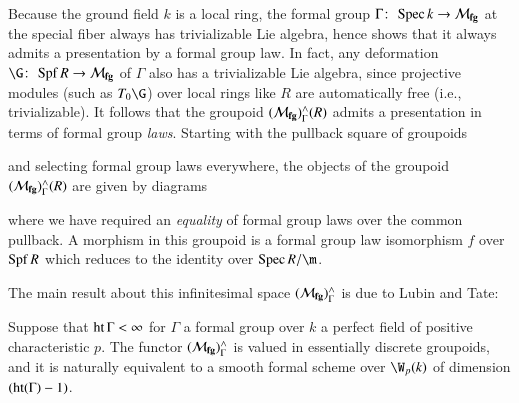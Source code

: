 \begin{remark}\label{LubinTateStackInFGLTerms}
Because the ground field $k$ is a local ring, the formal group $\Gamma\colon\thinspace \operatorname{Spec} k \to \mathcal{M}_{\mathbf{fg}}$ at the special fiber always has trivializable Lie algebra, hence  shows that it always admits a presentation by a formal group law.  In fact, any deformation $\G\co \Spf R \to \moduli{fg}$ of $\Gamma$ also has a trivializable Lie algebra, since projective modules (such as $T_0 \G$) over local rings like $R$ are automatically free (i.e., trivializable).  It follows that the groupoid $(\mathcal{M}_{\mathbf{fg}})^\wedge_\Gamma(R)$ admits a presentation in terms of formal group \emph{laws}.  Starting with the pullback square of groupoids
\begin{center}
\end{center}
and selecting formal group laws everywhere, the objects of the groupoid $(\mathcal{M}_{\mathbf{fg}})^\wedge_\Gamma(R)$ are given by diagrams
\begin{center}
\end{center}
where we have required an \emph{equality} of formal group laws over the common pullback.  A morphism in this groupoid is a formal group law isomorphism $f$ over $\operatorname{Spf} R$ which reduces to the identity over $\Spec R/\m$.
\end{remark}

The main result about this infinitesimal space $(\mathcal{M}_{\mathbf{fg}})^\wedge_\Gamma$ is due to Lubin and Tate:
\begin{theorem}\label{LubinTateModuliThm}
Suppose that $\operatorname{ht} \Gamma < \infty$ for $\Gamma$ a formal group over $k$ a perfect field of positive characteristic $p$.  The functor $(\mathcal{M}_{\mathbf{fg}})^\wedge_\Gamma$ is valued in essentially discrete groupoids, and it is naturally equivalent to a smooth formal scheme over $\W_p(k)$ of dimension $(\operatorname{ht}(\Gamma) - 1)$.
\end{theorem}

